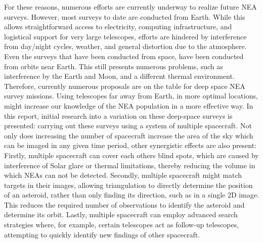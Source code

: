 For these reasons, numerous efforts are currently underway to realize future NEA surveys. However, most surveys to date are conducted from Earth. While this allows straightforward access to electricity, computing infrastructure, and logistical support for very large telescopes, efforts are hindered by interference from day/night cycles, weather, and general distortion due to the atmosphere. Even the surveys that have been conducted from space, have been conducted from orbits near Earth. This still presents numerous problems, such as interference by the Earth and Moon, and a different thermal environment. Therefore, currently numerous proposals are on the table for deep space NEA survey missions. Using telescopes far away from Earth, in more optimal locations, might increase our knowledge of the NEA population in a more effective way. In this report, initial research into a variation on these deep-space surveys is presented: carrying out these surveys using a system of multiple spacecraft. Not only does increasing the number of spacecraft increase the area of the sky which can be imaged in any given time period, other synergistic effects are also present: Firstly, multiple spacecraft can cover each others blind spots, which are caused by interference of Solar glare or thermal limitations, thereby reducing the volume in which NEAs can not be detected. Secondly, multiple spacecraft might match targets in their images, allowing triangulation to directly determine the position of an asteroid, rather than only finding its direction, such as in a single 2D image. This reduces the required number of observations to identify the asteroid and determine its orbit. Lastly, multiple spacecraft can employ advanced search strategies where, for example, certain telescopes act as follow-up telescopes, attempting to quickly identify new findings of other spacecraft. \\

